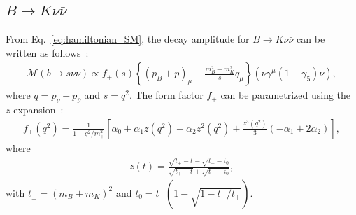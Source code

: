 \subsection{$B\rightarrow K\nu\bar{\nu}$}
From Eq.~\ref{eq:hamiltonian_SM}, the decay amplitude for $B\rightarrow K\nu\bar{\nu}$ can be written as follows~\cite{Ali:1999mm}:
\begin{align}
    \label{eq:Kamp}
    \mathcal{M}(b\rightarrow s \nu \bar{\nu}) \propto f_{+}(s) \left\{ (p_{B}+p)_{\mu} - \frac{m^{2}_{B}-m^{2}_{K}}{s}q_{\mu} \right\} \left( \bar{\nu} \gamma^{\mu}(1-\gamma_{5})\nu \right),
\end{align}
where $q = p_{\nu} + p_{\bar{\nu}}$ and $s = q^{2}$.
The form factor $f_{+}$ can be parametrized using the $z$ expansion~\cite{Parrott:2022rgu,Buras:2014fpa}:
\begin{align}
    \label{eq:Knunu_formfactor}
    f_{+}(q^{2})=\frac{1}{1-q^{2}/m^{2}_{+}}\left[\alpha_{0} + \alpha_{1}z(q^{2}) + \alpha_{2} z^{2}(q^{2}) + \frac{z^{3}(q^{2})}{3}(-\alpha_{1} + 2\alpha_{2}) \right],
\end{align}
where 
\begin{align}
    z(t) = \frac{\sqrt{t_{+}-t} - \sqrt{t_{+}-t_{0}}}{\sqrt{t_{+}-t} + \sqrt{t_{+}-t_{0}}},
\end{align}
with $t_{\pm}=(m_{B}\pm m_{K})^{2}$ and $t_{0}=t_{+}(1-\sqrt{1-t_{-}/t_{+}})$.

